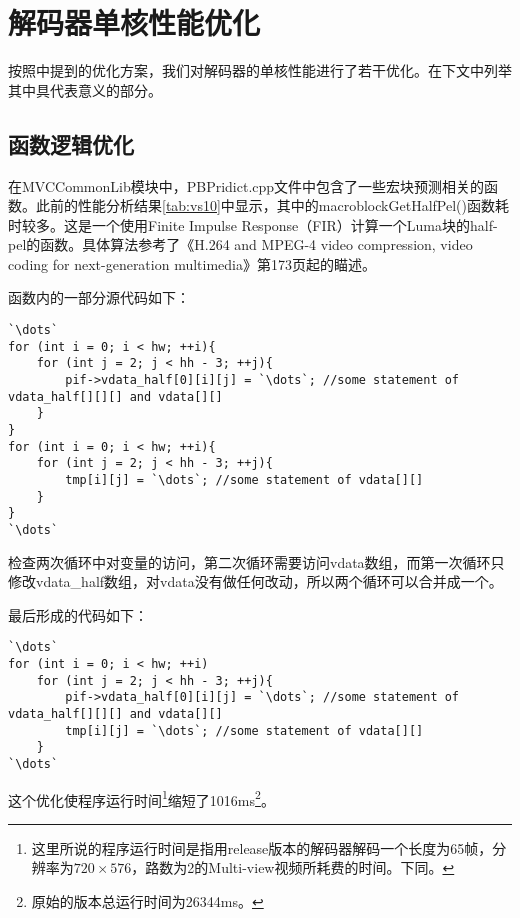 

\chapter{解码器单核性能优化}
\label{cha:singlecoreopt}

按照中提到的优化方案，我们对解码器的单核性能进行了若干优化。在下文中列举其中具代表意义的部分。

\section{函数逻辑优化}
\label{sec:singlecorelogicopt}

在MVCCommonLib模块中，PBPridict.cpp文件中包含了一些宏块预测相关的函数。此前的性能分析结果\autoref{tab:vs10}中显示，其中的macroblockGetHalfPel()函数耗时较多。这是一个使用Finite Impulse Response（FIR）计算一个Luma块的half-pel的函数。具体算法参考了《H.264 and MPEG-4 video compression, video coding for next-generation multimedia》\cite{richardson2003h}第173页起的瞄述。

函数内的一部分源代码如下：
\begin{lstlisting}[caption = {macroblockGetHalfPel()函数片段（优化前）}, label = lst:macroblockGetHalfPelorig]
`\dots`
for (int i = 0; i < hw; ++i){
	for (int j = 2; j < hh - 3; ++j){
		pif->vdata_half[0][i][j] = `\dots`; //some statement of vdata_half[][][] and vdata[][]
	}
}
for (int i = 0; i < hw; ++i){
	for (int j = 2; j < hh - 3; ++j){
		tmp[i][j] = `\dots`; //some statement of vdata[][]
	}
}
`\dots`
\end{lstlisting}

检查两次循环中对变量的访问，第二次循环需要访问vdata数组，而第一次循环只修改vdata\_half数组，对vdata没有做任何改动，所以两个循环可以合并成一个。

最后形成的代码如下：

\begin{lstlisting}[caption = {macroblockGetHalfPel()函数片段（优化后）}, label = lst:macroblockGetHalfPelopt]
`\dots`
for (int i = 0; i < hw; ++i)
	for (int j = 2; j < hh - 3; ++j){
		pif->vdata_half[0][i][j] = `\dots`; //some statement of vdata_half[][][] and vdata[][]
		tmp[i][j] = `\dots`; //some statement of vdata[][]
	}
`\dots`
\end{lstlisting}

这个优化使程序运行时间\footnote{这里所说的程序运行时间是指用release版本的解码器解码一个长度为65帧，分辨率为$720\times576$，路数为2的Multi-view视频所耗费的时间。下同。}缩短了1016ms\footnote{原始的版本总运行时间为26344ms。}。

